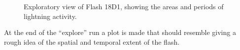 \begin{figure}[th]
	\caption{Exploratory view of Flash 18D1, showing the areas and periods of lightning activity.}	 
\end{figure}

At the end of the ``explore'' run a plot is made that should resemble  giving a rough idea of the spatial and temporal extent of the flash.


